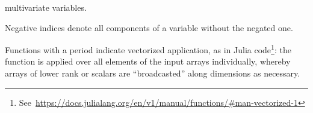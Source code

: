 \begin{description}[style=nextline, leftmargin=4cm]
  multivariate variables.
\item[{\(z_{-i} = [z_{1}, \ldots, z_{i-1}, z_{i+1}, \ldots, z_{N}]\)}] Negative indices denote all
  components of a variable without the negated one.
\item[{\(\broadcast{f}(x, 1) = [f(x_{1}, 1), \ldots, f(x_{N}, 1)]\)}] Functions with a period
  indicate vectorized application, as in Julia
  code\footnote{See~\protect\url{https://docs.julialang.org/en/v1/manual/functions/\#man-vectorized-1}}:
  the function is applied over all elements of the input arrays individually, whereby arrays of
  lower rank or scalars are \enquote{broadcasted} along dimensions as necessary.
\item
\end{description}

